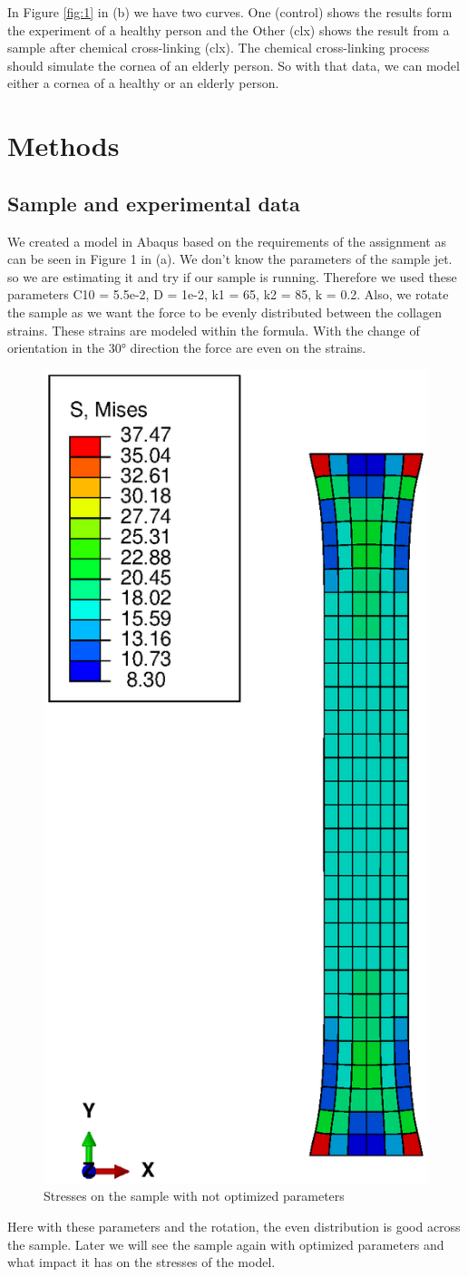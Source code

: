 \documentclass[12pt]{article}
\begin{document}
  In Figure \ref{fig:1} in (b) we have two curves. One (control) shows the results form the experiment of a healthy person and the Other (clx) shows the result from a sample after chemical cross-linking (clx). The chemical cross-linking process should simulate the cornea of an elderly person. So with that data, we can model either a cornea of a healthy or an elderly person.
\newpage
\section{Methods}

\subsection{Sample and experimental data}
We created a model in Abaqus based on the requirements of the assignment as can be seen in Figure 1 in (a). We don't know the parameters of the sample jet. so we are estimating it and try if our sample is running. Therefore we used these parameters C10 = 5.5e-2, D = 1e-2, k1 = 65, k2 = 85, k = 0.2. Also, we rotate the sample as we want the force to be evenly distributed between the collagen strains. These strains are modeled within the formula. With the change of orientation in the \ang{30} direction the force are even on the strains.
\begin{figure}[!htb]
  \centering
  \includegraphics[width=0.5\linewidth]{pics/s_mises_45_bad}
 \caption{Stresses on the sample with not optimized parameters}
  \label{fig:2}
\end{figure}
Here with these parameters and the rotation, the even distribution is good across the sample. Later we will see the sample again with optimized parameters and what impact it has on the stresses of the model.
\pagebreak
\end{document}
